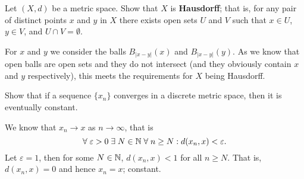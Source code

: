 \setcounter{question}{9}
\question Let $(X, d)$ be a metric space. Show that $X$ is \textbf{Hausdorff}; that is, for any pair of distinct points $x$ and $y$ in $X$ there exists open sets $U$ and $V$ such that $x \in U$, $y \in V$, and $U \cap V = \emptyset$.
\begin{solution}
    For $x$ and $y$ we consider the balls $B_{\lvert x - y \rvert}(x)$ and $B_{\lvert x - y \rvert}(y)$. As we know that open balls are open sets and they do not intersect (and they obviously contain $x$ and $y$ respectively), this meets the requirements for $X$ being Hausdorff.
\end{solution}

\setcounter{question}{14}
\question Show that if a sequence $\{x_n\}$ converges in a discrete metric space, then it is eventually constant.
\begin{solution}
    We know that $x_n \to x$ as $n \to \infty$, that is
    \[ \forall\; \varepsilon > 0 \;\exists\; N \in \mathbb{N} \;\forall\; n \geq N: d(x_n, x) < \varepsilon. \]
    Let $\varepsilon = 1$, then for some $N \in \mathbb{N}$, $d(x_n, x) < 1$ for all $n \geq N$. That is, $d(x_n , x) = 0$ and hence $x_n = x$; constant.
\end{solution}
